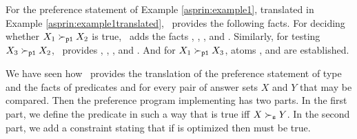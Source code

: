 \begin{example}
For the preference statement  of Example \ref{asprin:example1}, 
translated in Example \ref{asprin:example1translated}, \asprin\ provides the following facts. 
For deciding whether $X_1 \succ_{\texttt{p1}} X_2$ is true,
\asprin\ adds the facts
, , , and .
Similarly, for testing $X_3 \succ_{\texttt{p1}} X_2$, \asprin\ provides
, , ,  and .
And for $X_1 \succ_{\texttt{p1}} X_3$, 
atoms ,  and  are established.
\end{example}

We have seen how \asprin\ provides the translation of the preference statement  of type  
and the facts of predicates  and  
for every pair of answer sets $X$ and $Y$ that may be compared.
Then the preference program implementing  has two parts.
In the first part, we define the predicate  
in such a way that  is true 
iff $X \succ_{\texttt{s}} Y$.
In the second part, we add a constraint stating that 
if  is optimized then  must be true. 

